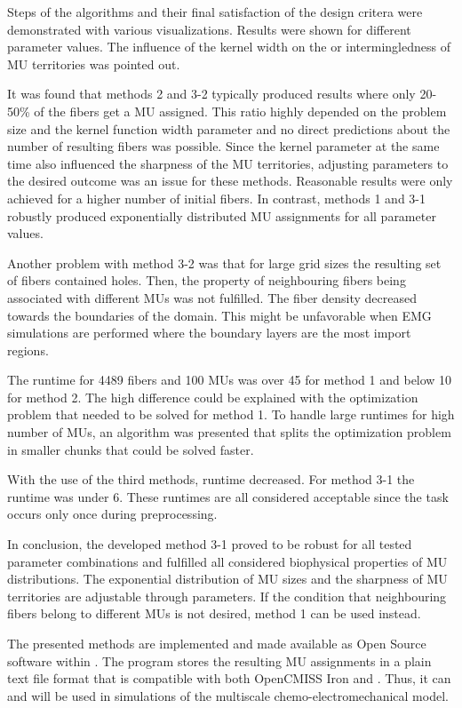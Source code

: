 Steps of the algorithms and their final satisfaction of the design critera were demonstrated with various visualizations. Results were shown for different parameter values. The influence of the kernel width on the  or intermingledness of MU territories was pointed out. 

It was found that methods 2 and 3-2 typically produced results where only 20-50\% of the fibers get a MU assigned. This ratio highly depended on the problem size and the kernel function width parameter and no direct predictions about the number of resulting fibers was possible. Since the kernel parameter at the same time also influenced the sharpness of the MU territories, adjusting parameters to the desired outcome was an issue for these methods. Reasonable results were only achieved for a higher number of initial fibers. In contrast, methods 1 and 3-1 robustly produced exponentially distributed MU assignments for all parameter values.

Another problem with method 3-2 was that for large grid sizes the resulting set of fibers contained holes. Then, the property of neighbouring fibers being associated with different MUs was not fulfilled. The fiber density decreased towards the boundaries of the domain. This might be unfavorable when EMG simulations are performed where the boundary layers are the most import regions.

The runtime for 4489 fibers and 100 MUs was over \SI{45}{\min} for method 1 and below \SI{10}{\sec} for method 2. The high difference could be explained with the optimization problem that needed to be solved for method 1. To handle large runtimes for high number of MUs, an algorithm was presented that splits the optimization problem in smaller chunks that could be solved faster.

With the use of the third methods, runtime decreased. For method 3-1 the runtime was under \SI{6}{\min}. These runtimes are all considered acceptable since the task occurs only once during preprocessing. 

In conclusion, the developed method 3-1 proved to be robust for all tested parameter combinations and fulfilled all considered biophysical properties of MU distributions. The exponential distribution of MU sizes and the sharpness of MU territories are adjustable through parameters. If the condition that neighbouring fibers belong to different MUs is not desired, method 1 can be used instead.

The presented methods are implemented and made available as Open Source software within \opendihu{}.
The program stores the resulting MU assignments in a plain text file format that is compatible with both OpenCMISS Iron and \opendihu{}. Thus, it can and will be used in simulations of the multiscale chemo-electromechanical model.
